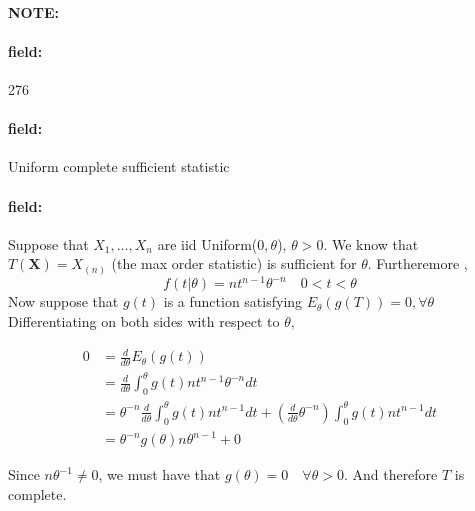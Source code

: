 \documentclass[12pt]{article}
\newenvironment{note}{\paragraph{NOTE:}}{}
\newenvironment{field}{\paragraph{field:}}{}
\begin{document}
\begin{note} \begin{field} \tiny 276 \end{field}
  \begin{field}
    Uniform complete sufficient statistic
  \end{field}
  \begin{field}
    Suppose that $X_1, \ldots , X_n$ are iid Uniform($0,\theta$), $\theta > 0$. We know that $T(\mathbf{X}) = X_{(n)}$ (the max order statistic) is sufficient for $\theta$. Furtheremore ,
    $$ f(t|\theta) = nt^{n-1}\theta^{-n} \quad 0 < t < \theta$$
    Now suppose that $g(t)$ is a function satisfying $E_\theta(g(T)) =0, \forall \theta$
    Differentiating on both sides with respect to $\theta$,

    \begin{align*}
       0 &= \frac{d}{d\theta} E_\theta(g(t))\\
       &= \frac{d}{d\theta} \int_0^\theta g(t)nt^{n-1}\theta^{-n} dt\\
       &= \theta^{-n}\frac{d}{d\theta} \int_0^\theta g(t)nt^{n-1} dt + (\frac{d}{d\theta}\theta^{-n}) \int_0^\theta g(t)nt^{n-1}dt \\
       &= \theta^{-n}g(\theta)n\theta^{n-1} + 0
    \end{align*}

    Since $n\theta^{-1} \neq 0$, we must have that $g(\theta) =0 \quad \forall \theta> 0$. And therefore $T$ is complete.
  \end{field}
\end{note}
\end{document}
